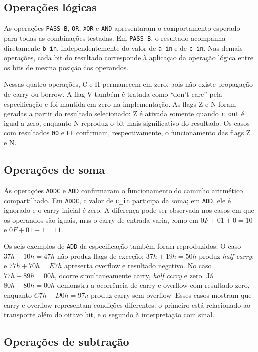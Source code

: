 \subsection{Operações lógicas}

As operações \texttt{PASS\_B}, \texttt{OR}, \texttt{XOR} e \texttt{AND}
apresentaram o comportamento esperado para todas as combinações testadas. Em
\texttt{PASS\_B}, o resultado acompanha diretamente \texttt{b\_in},
independentemente do valor de \texttt{a\_in} e de \texttt{c\_in}. Nas demais
operações, cada bit do resultado corresponde à aplicação da operação lógica
entre os bits de mesma posição dos operandos.

Nessas quatro operações, C e H permanecem em zero, pois não existe propagação
de carry ou borrow. A flag V também é tratada como ``don't care'' pela
especificação e foi mantida em zero na implementação. As flags Z e N foram
geradas a partir do resultado selecionado: Z é ativada somente quando
\texttt{r\_out} é igual a zero, enquanto N reproduz o bit mais significativo
do resultado. Os casos com resultados \texttt{00} e \texttt{FF} confirmam,
respectivamente, o funcionamento das flags Z e N.

\subsection{Operações de soma}

As operações \texttt{ADDC} e \texttt{ADD} confirmaram o funcionamento do
caminho aritmético compartilhado. Em \texttt{ADDC}, o valor de
\texttt{c\_in} participa da soma; em \texttt{ADD}, ele é ignorado e o carry
inicial é zero. A diferença pode ser observada nos casos em que os operandos
são iguais, mas o carry de entrada varia, como em
$0F + 01 + 0 = 10$ e $0F + 01 + 1 = 11$.

Os seis exemplos de \texttt{ADD} da especificação também foram reproduzidos.
O caso $37h + 10h = 47h$ não produz flags de exceção; $37h + 19h = 50h$
produz \textit{half carry}; e $77h + 70h = E7h$ apresenta overflow e
resultado negativo. No caso $77h + 89h = 00h$, ocorre simultaneamente carry,
\textit{half carry} e zero. Já $80h + 80h = 00h$ demonstra a ocorrência de
carry e overflow com resultado zero, enquanto $C7h + D0h = 97h$ produz carry
sem overflow. Esses casos mostram que carry e overflow representam condições
diferentes: o primeiro está relacionado ao transporte além do oitavo bit, e o
segundo à interpretação com sinal.

\subsection{Operações de subtração}

